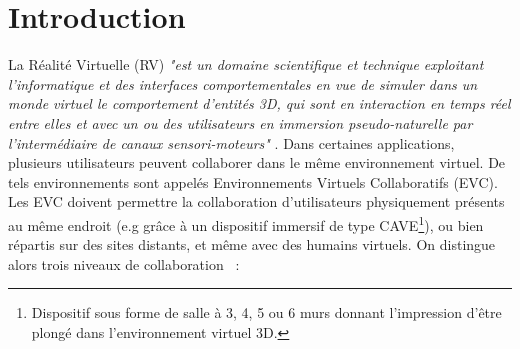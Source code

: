 \documentclass[11pt]{article}
\begin{document}
\section{Introduction}


La Réalité Virtuelle (RV) \textit{"est un domaine scientifique et technique exploitant l’informatique et des interfaces comportementales en vue de simuler dans un monde virtuel le comportement d’entités 3D, qui sont en interaction en temps réel entre elles et avec un ou des utilisateurs en immersion pseudo-naturelle par l’intermédiaire de canaux sensori-moteurs"} \cite{trv4-intro}. Dans certaines applications, plusieurs utilisateurs peuvent collaborer dans le même environnement virtuel. De tels environnements sont appelés Environnements Virtuels Collaboratifs (EVC). Les EVC doivent permettre la collaboration d'utilisateurs physiquement présents au même endroit (e.g grâce à un dispositif immersif de type CAVE\footnote{Dispositif sous forme de salle à 3, 4, 5 ou 6 murs donnant l'impression d'être plongé dans l'environnement virtuel 3D.}), ou bien répartis sur des sites distants, et même avec des humains virtuels. On distingue alors trois niveaux de collaboration \cite{margery}~:
\end{document}

